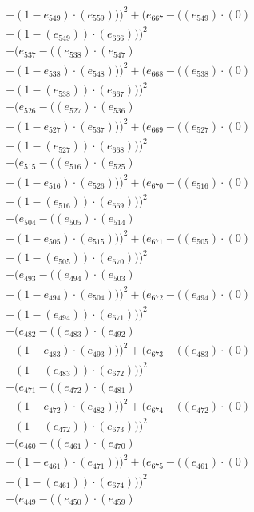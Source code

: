 \documentclass[10pt, a4paper]{article}
\begin{document}
\begin{small}
\begin{align*}
& + (1 - e_{549})  \cdot  (e_{559})))^{2} + (e_{667} - ((e_{549}) \cdot (0) \\
& + (1 - (e_{549})) \cdot (e_{666})))^{2} \\
& + (e_{537} - ((e_{538})  \cdot  (e_{547}) \\
& + (1 - e_{538})  \cdot  (e_{548})))^{2} + (e_{668} - ((e_{538}) \cdot (0) \\
& + (1 - (e_{538})) \cdot (e_{667})))^{2} \\
& + (e_{526} - ((e_{527})  \cdot  (e_{536}) \\
& + (1 - e_{527})  \cdot  (e_{537})))^{2} + (e_{669} - ((e_{527}) \cdot (0) \\
& + (1 - (e_{527})) \cdot (e_{668})))^{2} \\
& + (e_{515} - ((e_{516})  \cdot  (e_{525}) \\
& + (1 - e_{516})  \cdot  (e_{526})))^{2} + (e_{670} - ((e_{516}) \cdot (0) \\
& + (1 - (e_{516})) \cdot (e_{669})))^{2} \\
& + (e_{504} - ((e_{505})  \cdot  (e_{514}) \\
& + (1 - e_{505})  \cdot  (e_{515})))^{2} + (e_{671} - ((e_{505}) \cdot (0) \\
& + (1 - (e_{505})) \cdot (e_{670})))^{2} \\
& + (e_{493} - ((e_{494})  \cdot  (e_{503}) \\
& + (1 - e_{494})  \cdot  (e_{504})))^{2} + (e_{672} - ((e_{494}) \cdot (0) \\
& + (1 - (e_{494})) \cdot (e_{671})))^{2} \\
& + (e_{482} - ((e_{483})  \cdot  (e_{492}) \\
& + (1 - e_{483})  \cdot  (e_{493})))^{2} + (e_{673} - ((e_{483}) \cdot (0) \\
& + (1 - (e_{483})) \cdot (e_{672})))^{2} \\
& + (e_{471} - ((e_{472})  \cdot  (e_{481}) \\
& + (1 - e_{472})  \cdot  (e_{482})))^{2} + (e_{674} - ((e_{472}) \cdot (0) \\
& + (1 - (e_{472})) \cdot (e_{673})))^{2} \\
& + (e_{460} - ((e_{461})  \cdot  (e_{470}) \\
& + (1 - e_{461})  \cdot  (e_{471})))^{2} + (e_{675} - ((e_{461}) \cdot (0) \\
& + (1 - (e_{461})) \cdot (e_{674})))^{2} \\
& + (e_{449} - ((e_{450})  \cdot  (e_{459}) \\

\end{align*}
\end{small}
\end{document}
